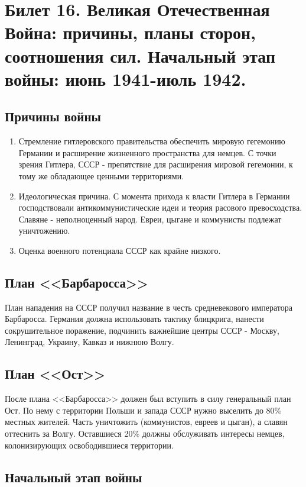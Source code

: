 \section{Билет 16. Великая Отечественная Война: причины, планы сторон, соотношения сил. Начальный этап войны: июнь 1941-июль 1942.}

\subsection{Причины войны}
\begin{enumerate}
    \item Стремление гитлеровского правительства обеспечить мировую гегемонию Германии и расширение жизненного пространства для немцев. С точки зрения Гитлера, СССР - препятствие для расширения мировой гегемонии, к тому же обладающее ценными территориями.
    \item Идеологическая причина. С момента прихода к власти Гитлера в Германии господствовали антикоммунистические идеи и теория расового превосходства. Славяне - неполноценный народ. Евреи, цыгане и коммунисты подлежат уничтожению.
    \item Оценка военного потенциала СССР как крайне низкого.
\end{enumerate}

\subsection{План <<Барбаросса>>}

План нападения на СССР получил название в честь средневекового императора Барбаросса. Германия должна использовать тактику блицкрига, нанести сокрушительное поражение, подчинить важнейшие центры СССР - Москву, Ленинград, Украину, Кавказ и нижнюю Волгу. 

\subsection{План <<Ост>>}

После плана <<Барбаросса>> должен был вступить в силу генеральный план Ост. По нему с территории Польши и запада СССР нужно выселить до 80\% местных жителей. Часть уничтожить (коммунистов, евреев и цыган), а славян оттеснить за Волгу. Оставшиеся 20\% должны обслуживать интересы немцев, колонизирующих освободившиеся территории.

\subsection{Начальный этап войны}

